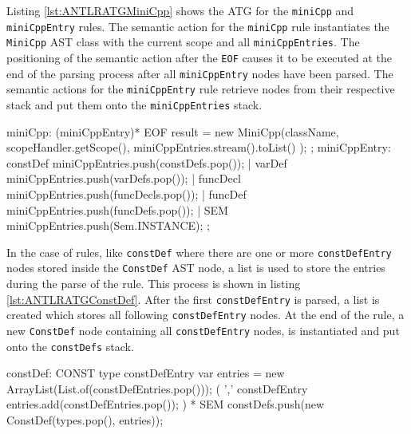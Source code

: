Listing \ref{lst:ANTLRATGMiniCpp} shows the ATG for the \verb|miniCpp| and \verb|miniCppEntry| rules. The semantic action for the \verb|miniCpp| rule instantiates the \verb|MiniCpp| AST class with the current scope and all \verb|miniCppEntries|. The positioning of the semantic action after the \verb|EOF| causes it to be executed at the end of the parsing process after all \verb|miniCppEntry| nodes have been parsed. The semantic actions for the \verb|miniCppEntry| rule retrieve nodes from their respective stack and put them onto the \verb|miniCppEntries| stack.   

\begin{AntlrCode}[float,numbers=none,caption=ATG for the \texttt{miniCpp} and \texttt{miniCppEntry} rules., label=lst:ANTLRATGMiniCpp]
miniCpp: (miniCppEntry)* EOF                    
    { 
        result = new MiniCpp(className,
           scopeHandler.getScope(),
           miniCppEntries.stream().toList()
        ); 
    }
;
miniCppEntry:     
      constDef                  { miniCppEntries.push(constDefs.pop()); }
    | varDef                    { miniCppEntries.push(varDefs.pop()); }
    | funcDecl                  { miniCppEntries.push(funcDecls.pop()); }
    | funcDef                   { miniCppEntries.push(funcDefs.pop()); }
    | SEM                       { miniCppEntries.push(Sem.INSTANCE); }
;
\end{AntlrCode}
    

In the case of rules, like \verb|constDef| where there are one or more \verb|constDefEntry| nodes stored inside the \verb|ConstDef| AST node, a list is used to store the entries during the parse of the rule. This process is shown in listing \ref{lst:ANTLRATGConstDef}. After the first \verb|constDefEntry| is parsed, a list is created which stores all following \verb|constDefEntry| nodes.
At the end of the rule, a new \verb|ConstDef| node containing all \verb|constDefEntry| nodes, is instantiated and put onto the \verb|constDefs| stack.



\begin{AntlrCode}[float,numbers=none,caption=ATG for the \texttt{constDef} rule., label=lst:ANTLRATGConstDef]
constDef:    
    CONST type constDefEntry          
        { var entries = new ArrayList(List.of(constDefEntries.pop())); }
    (
        ',' constDefEntry           
        { entries.add(constDefEntries.pop());}
    )   * SEM
        { constDefs.push(new ConstDef(types.pop(), entries)); }
\end{AntlrCode}


